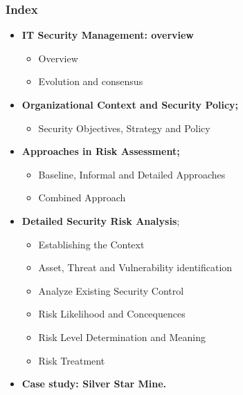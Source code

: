 \documentclass[xcolor ={table,usenames,dvipsnames}]{beamer}
\theoremstyle{definition}
\begin{document}
	\begin{frame}
		\frametitle{Index}
		\begin{itemize}
			\item <0> \textbf{IT Security Management: overview}
			\begin{itemize}
				\item Overview
				\item Evolution and consensus
			\end{itemize}
			\item <1->  \textbf{Organizational Context and Security Policy;}
			\begin{itemize}
				\item Security Objectives, Strategy and Policy
			\end{itemize}
			\item <0>  \textbf{Approaches in Risk Assessment;}
			\begin{itemize}
				\item Baseline, Informal and Detailed Approaches
				\item Combined Approach
			\end{itemize}
			\item <0> \textbf{Detailed Security Risk Analysis};
			\begin{itemize}
				\item Establishing the Context
				\item Asset, Threat and Vulnerability identification
				\item Analyze Existing Security Control
				\item Risk Likelihood and Concequences
				\item Risk Level Determination and Meaning
				\item Risk Treatment
			\end{itemize}
			\item <0> \textbf{Case study: Silver Star Mine.}
		\end{itemize}
	\end{frame}
\end{document}
